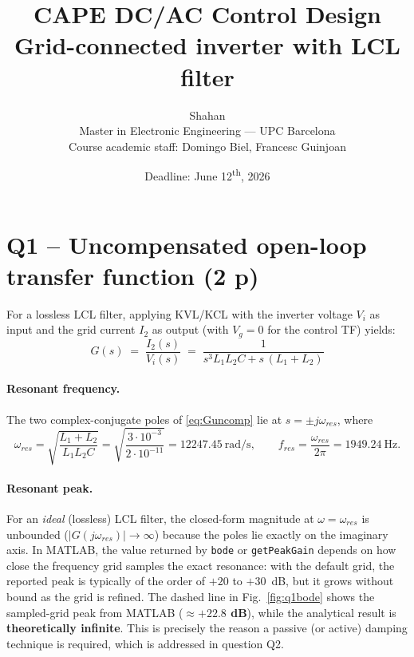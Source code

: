 \documentclass[11pt,a4paper]{article}
\title{\textbf{CAPE DC/AC Control Design}\\[4pt]
       \large Grid-connected inverter with LCL filter}
\author{Shahan \\
\small Master in Electronic Engineering --- UPC Barcelona\\
\small Course academic staff: Domingo Biel, Francesc Guinjoan}
\date{Deadline: June 12\textsuperscript{th}, 2026}
\begin{document}
\maketitle
\thispagestyle{empty}

\begin{center}
\end{center}

\vspace{4pt}

\section{Q1 -- Uncompensated open-loop transfer function (2 p)}

For a lossless LCL filter, applying KVL/KCL with the inverter
voltage $V_i$ as input and the grid current $I_2$ as output (with
$V_g=0$ for the control TF) yields:
\begin{equation}
\boxed{\;
G(s) \;=\; \dfrac{I_2(s)}{V_i(s)} \;=\; \dfrac{1}{s^3 L_1 L_2 C + s\,(L_1+L_2)}\;}
\label{eq:Guncomp}
\end{equation}

\paragraph{Resonant frequency.}
The two complex-conjugate poles of \eqref{eq:Guncomp} lie at
$s = \pm j\omega_{res}$, where
\begin{equation}
\omega_{res} = \sqrt{\dfrac{L_1+L_2}{L_1 L_2 C}}
= \sqrt{\dfrac{3\cdot 10^{-3}}{2\cdot 10^{-11}}}
= \SI{12247.45}{\radian\per\second},
\qquad
f_{res} = \dfrac{\omega_{res}}{2\pi} = \boxed{\SI{1949.24}{\hertz}}.
\end{equation}

\paragraph{Resonant peak.}
For an \emph{ideal} (lossless) LCL filter, the closed-form magnitude
at $\omega = \omega_{res}$ is unbounded
($|G(j\omega_{res})| \to \infty$) because the poles lie exactly on the
imaginary axis. In MATLAB, the value returned by \texttt{bode} or
\texttt{getPeakGain} depends on how close the frequency grid samples
the exact resonance: with the default grid, the reported peak is
typically of the order of $+20$ to $+30$~dB, but it grows without
bound as the grid is refined. The dashed line in
Fig.~\ref{fig:q1bode} shows the sampled-grid peak from MATLAB
(\textbf{$\approx +22.8$ dB}), while the analytical result is
\textbf{theoretically infinite}. This is precisely the reason a
passive (or active) damping technique is required, which is addressed
in question Q2.
\end{document}
